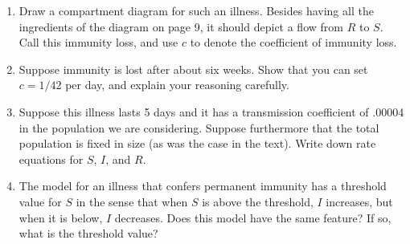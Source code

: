 \documentclass
[justified,nohyper]
{tufte-handout}
\begin{document}
\begin{enumerate}
	\item Draw a compartment diagram for such an illness. Besides having all the ingredients of the diagram on page 9, it should depict a flow from $R$ to $S$. Call this immunity loss, and use $c$ to denote the coefficient of immunity loss.
	\item Suppose immunity is lost after about six weeks. Show that you can set $c = 1/42$ per day, and explain your reasoning carefully.
	\item Suppose this illness lasts 5 days and it has a transmission coefficient of .00004 in the population we are considering. Suppose furthermore that the total population is fixed in size (as was the case in the text). Write down rate equations for $S$, $I$, and $R$.
	\item The model for an illness that confers permanent immunity has a threshold value for $S$ in the sense that when $S$ is above the threshold, $I$ increases, but when it is below, $I$ decreases. Does this model have the same feature? If so, what is the threshold value?
\end{enumerate}
\end{document}
